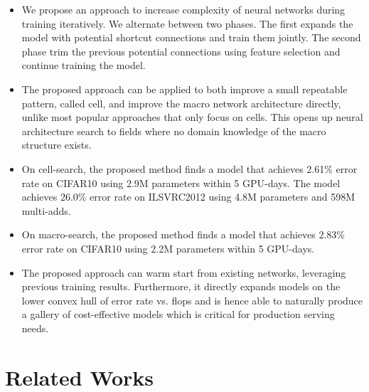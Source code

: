 \begin{itemize}
\item We propose an approach to increase complexity of neural networks during training iteratively. We alternate between two phases. The first expands the model with potential shortcut connections and train them jointly. The second phase trim the previous potential connections using feature selection and continue training the model. 
\item The proposed approach can be applied to both improve a small repeatable pattern, called cell, and improve the macro network architecture directly, unlike most popular approaches that only focus on cells. This opens up neural architecture search to fields where no domain knowledge of the macro structure exists. 
\item On cell-search, the proposed method finds a model that achieves 2.61\% error rate on CIFAR10 using 2.9M parameters within 5 GPU-days. 
The model achieves 26.0\% error rate on ILSVRC2012 using 4.8M parameters and 598M multi-adds.
\item On macro-search, the proposed method finds a model that achieves 2.83\% error rate on CIFAR10 using 2.2M parameters within 5 GPU-days. 
\item The proposed approach can warm start from existing networks, leveraging previous training results. Furthermore, it directly expands models on the lower convex hull of error rate vs. flops and is hence able to naturally produce a gallery of cost-effective models which is critical for production serving needs. 
\end{itemize}


\section{Related Works}
\label{sec:nas_background}

